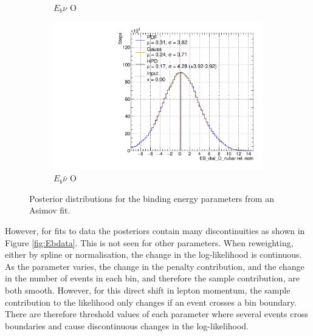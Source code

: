\begin{figure}
\begin{subfigure}{.48\textwidth}
  \caption{$E_{b}\nu$ O}
\end{subfigure}
\begin{subfigure}{.48\textwidth}
  \centering
  \includegraphics[width=0.73\linewidth]{figs/EB_dial_O_nubarAsmv}
  \caption{$E_{b}\bar{\nu}$ O}
\end{subfigure}
\caption{Posterior distributions for the binding energy parameters from an Asimov fit.}
\label{fig:Ebasimov}
\end{figure}

However, for fits to data the posteriors contain many discontinuities as shown in Figure \ref{fig:Ebdata}. This is not seen for other parameters. When reweighting, either by spline or normalisation, the change in the log-likelihood is continuous. As the parameter varies, the change in the penalty contribution, and the change in the number of events in each bin, and therefore the sample contribution, are both smooth. However, for this direct shift in lepton momentum, the sample contribution to the likelihood only changes if an event crosses a bin boundary. There are therefore threshold values of each parameter where several events cross boundaries and cause discontinuous changes in the log-likelihood.


